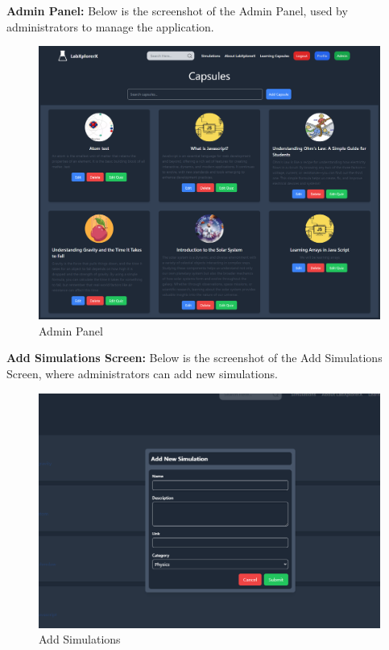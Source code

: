 \textbf{Admin Panel:} Below is the screenshot of the Admin Panel, used by administrators to manage the application.
\begin{figure}[H]
    \centering
    \includegraphics[width = 16cm]{Diagrams/output/admin.png}
    \caption{Admin Panel}
\end{figure}
\newpage

\textbf{Add Simulations Screen:} Below is the screenshot of the Add Simulations Screen, where administrators can add new simulations.
\begin{figure}[H]
    \centering
    \includegraphics[width = 15cm]{Diagrams/output/addsimulations.png}
    \caption{Add Simulations}
\end{figure}

